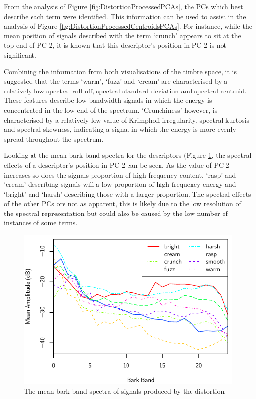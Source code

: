 			From the analysis of Figure \ref{fig:DistortionProcessedPCAs}, the PCs which best describe each
			term were identified. This information can be used to assist in the analysis of Figure
			\ref{fig:DistortionProcessedCentroidsPCAs}. For instance, while the mean position of signals
			described with the term `crunch' appears to sit at the top end of PC 2, it is known that this
			descriptor's position in PC 2 is not significant.

			Combining the information from both visualisations of the timbre space, it is suggested that the
			terms `warm', `fuzz' and `cream' are characterised by a relatively low spectral roll off, spectral
			standard deviation and spectral centroid. These features describe low bandwidth signals in which
			the energy is concentrated in the low end of the spectrum. `Crunchiness' however, is characterised
			by a relatively low value of Krimphoff irregularity, spectral kurtosis and spectral skewness,
			indicating a signal in which the energy is more evenly spread throughout the spectrum.

			Looking at the mean bark band spectra for the descriptors (Figure
			\ref{fig:DistortionProcessedSpectra}, the spectral effects of a descriptor's position in PC 2 can
			be seen. As the value of PC 2 increases so does the signals proportion of high frequency content,
			`rasp' and `cream' describing signals will a low proportion of high frequency energy and `bright'
			and `harsh' describing those with a larger proportion. The spectral effects of the other PCs ore
			not as apparent, this is likely due to the low resolution of the spectral representation but could
			also be caused by the low number of instances of some terms.

			\begin{figure}[h!]
				\centering
				\includegraphics{chapter4/Images/DistortionProcessedSpectra.pdf}
				\caption{The mean bark band spectra of signals produced by the distortion.}
				\label{fig:DistortionProcessedSpectra}
			\end{figure}


